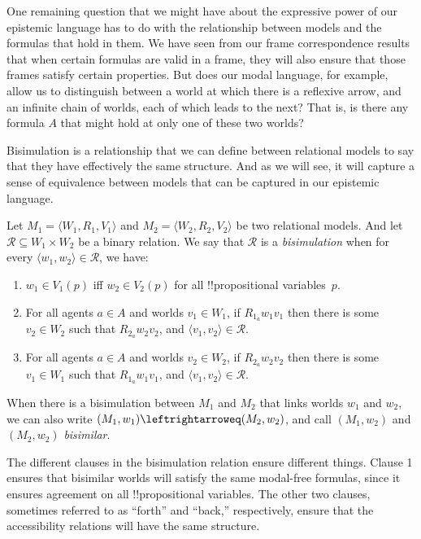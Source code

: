 \documentclass[../../../include/open-logic-section]{subfiles}
\begin{document}


One remaining question that we might have about the expressive power
of our epistemic language has to do with the relationship between
models and the formulas that hold in them. We have seen from our frame
correspondence results that when certain formulas are valid in a
frame, they will also ensure that those frames satisfy certain
properties. But does our modal language, for example, allow us to
distinguish between a world at which there is a reflexive arrow, and
an infinite chain of worlds, each of which leads to the next? That is,
is there any formula $A$ that might hold at only one of these two
worlds?

Bisimulation is a relationship that we can define between relational
models to say that they have effectively the same structure. And as we
will see, it will capture a sense of equivalence between models that
can be captured in our epistemic language.

\begin{defn}[Bisimulation]
Let $M_1 = \langle W_1, R_1, V_1 \rangle$ and $M_2 = \langle W_2, R_2, V_2 \rangle$ be two relational models. And let $\mathcal{R} \subseteq W_1 \times W_2$ be a binary relation. We say that $\mathcal{R}$ is a \emph{bisimulation} when for every $\langle w_1, w_2 \rangle \in \mathcal{R}$, we have:

\begin{enumerate}
  \item {$w_1 \in V_1(p)$ iff $w_2 \in V_2(p)$ for all
  !!{propositional variable}s~$p$.}{}
  \item {For all agents $a \in A$ and worlds $v_1 \in W_1$, if
  $R_{1_a} w_1 v_1$ then there is some $v_2 \in W_2$ such that
  $R_{2_a} w_2 v_2$, and $\langle v_1, v_2 \rangle \in
  \mathcal{R}$.}{}
  \item {For all agents $a \in A$ and worlds $v_2 \in W_2$, if
   $R_{2_a} w_2 v_2$ then there is some $v_1 \in W_1$ such that
   $R_{1_a} w_1 v_1$, and $\langle v_1, v_2 \rangle \in
   \mathcal{R}$.}{}
\end{enumerate}

When there is a bisimulation between $M_1$ and $M_2$ that links worlds
$w_1$ and $w_2$, we can also write $(M_1, w_1) \leftrightarroweq (M_2,
w_2)$, and call $(M_1, w_2)$ and $(M_2, w_2)$ \emph{bisimilar}.
\end{defn}

The different clauses in the bisimulation relation ensure different
things. Clause 1 ensures that bisimilar worlds will satisfy the same
modal-free formulas, since it ensures agreement on all
!!{propositional variable}s. The other two clauses, sometimes referred
to as ``forth'' and ``back,'' respectively, ensure that the
accessibility relations will have the same structure.
\end{document}
